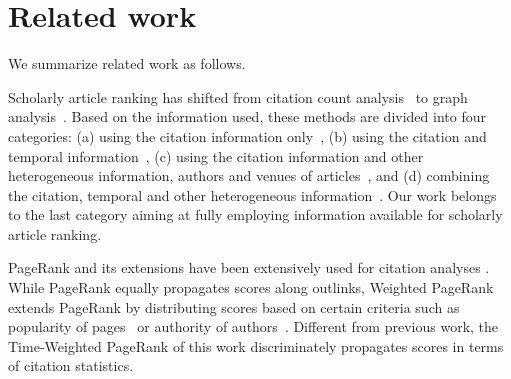 
\section{Related work} \label{sec-related}
We summarize related work as follows.


Scholarly article ranking has shifted from citation count analysis~\cite{Garfield471,Hirsch15112005} to graph analysis~\cite{ChenXMR07,Zhou07-CoRank,Jiang12-MRank,Liang16AAAI,Li08TSRanking,Wang13AAAI,WalkerXKM07,sayyadi09,
Wang16TIST,Ng11KDD}.
Based on the information used, these methods are divided into four categories: (a) using the citation information only~\cite{Garfield471,Hirsch15112005,ChenXMR07,Ng11KDD}, (b) using the citation and temporal information~\cite{Li08TSRanking,WalkerXKM07}, (c) using the citation information and other heterogeneous information, \eg authors and venues of articles~\cite{Zhou07-CoRank,Jiang12-MRank,Liang16AAAI}, and (d) combining the citation, temporal and other heterogeneous information~\cite{sayyadi09,Wang16TIST,Wang13AAAI}.
Our work belongs to the last category aiming at fully employing information available for scholarly article ranking.
%




PageRank \cite{Brin98:PageRank} and its extensions have been extensively used for citation analyses \cite{Waltman2014}. While PageRank equally propagates scores along outlinks, Weighted PageRank extends PageRank by distributing scores based on certain criteria such as popularity of pages~\cite{Xing04:WPR} or authority of authors~\cite{Ding11}.  Different from previous work, the Time-Weighted PageRank of this work discriminately propagates scores in terms of citation statistics.






